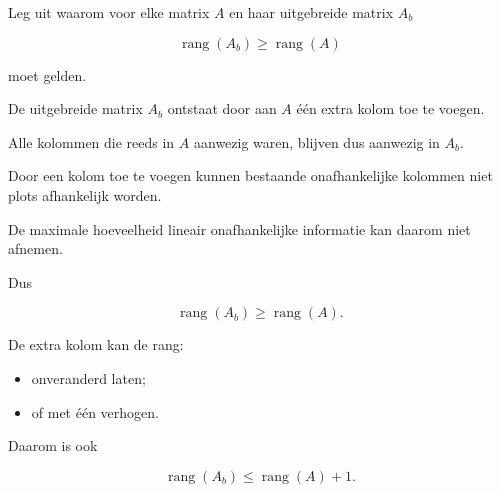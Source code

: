 \documentclass{ximera}
\begin{document}
\begin{oefening}{\oefG}

Leg uit waarom voor elke matrix \(A\) en haar uitgebreide matrix \(A_b\)

\[
\operatorname{rang}(A_b)
\geq
\operatorname{rang}(A)
\]

moet gelden.

\begin{oplossing}

De uitgebreide matrix \(A_b\) ontstaat door aan \(A\) één extra kolom
toe te voegen.

Alle kolommen die reeds in \(A\) aanwezig waren, blijven dus aanwezig
in \(A_b\).

Door een kolom toe te voegen kunnen bestaande onafhankelijke
kolommen niet plots afhankelijk worden.

De maximale hoeveelheid lineair onafhankelijke informatie kan daarom
niet afnemen.

Dus

\[
\operatorname{rang}(A_b)
\geq
\operatorname{rang}(A).
\]

De extra kolom kan de rang:

\begin{itemize}
    \item onveranderd laten;
    \item of met één verhogen.
\end{itemize}

Daarom is ook

\[
\operatorname{rang}(A_b)
\leq
\operatorname{rang}(A)+1.
\]

\end{oplossing}

\end{oefening}




\end{document}
